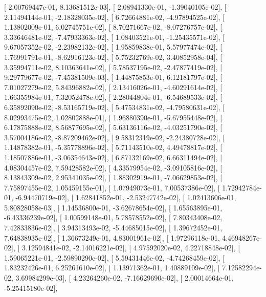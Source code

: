 \documentclass{article}
\begin{document}
       [  2.00769447e-01,   8.13681512e-03],
       [  2.08941330e-01,  -1.39040105e-02],
       [  2.11494144e-01,  -2.18328035e-02],
       [  6.72664881e-02,  -4.97894525e-02],
       [  1.13802009e-01,   6.02745751e-02],
       [  8.70271667e-02,  -8.07276757e-02],
       [  3.33646481e-02,  -7.47933363e-02],
       [  1.08403521e-01,  -1.25435571e-02],
       [  9.67057352e-02,  -2.23982132e-02],
       [  1.95859838e-01,   5.57977474e-02],
       [  1.76991791e-01,  -8.62916123e-02],
       [  5.75232769e-02,   3.40852958e-04],
       [  3.35994711e-02,   8.10363641e-02],
       [  5.78537195e-02,  -2.47877419e-02],
       [  9.29779677e-02,  -7.45381509e-03],
       [  1.44875853e-01,   6.12181797e-02],
       [  7.01027279e-02,   5.84396882e-02],
       [  2.13416026e-01,  -4.60291614e-02],
       [  1.66355984e-01,   7.32052478e-02],
       [  2.28044804e-01,  -6.54689533e-02],
       [  6.35892090e-02,  -8.53165719e-02],
       [  5.47534831e-02,  -4.79580631e-02],
       [  8.02993475e-02,   1.02802888e-01],
       [  1.96880390e-01,  -5.67955448e-02],
       [  6.17875888e-02,   8.56877695e-02],
       [  5.63136116e-02,  -4.03251790e-02],
       [  3.57004186e-02,  -8.87209462e-02],
       [  9.58312319e-02,  -2.24380728e-02],
       [  1.14878382e-01,  -5.35778896e-02],
       [  5.71143510e-02,   4.49478817e-02],
       [  1.18507886e-01,  -3.06354643e-02],
       [  6.87132169e-02,   6.66311494e-02],
       [  4.08304457e-02,   7.59428582e-02],
       [  4.33579954e-02,  -3.09105816e-02],
       [  8.13843309e-02,   2.95341035e-02],
       [  1.88302919e-01,  -7.06629853e-02],
       [  7.75897455e-02,   1.05459155e-01],
       [  1.07949073e-01,   7.00537386e-02],
       [  1.72942784e-01,  -6.94470719e-02],
       [  1.62841852e-01,  -2.53247742e-02],
       [  1.02413606e-01,   5.80828058e-03],
       [  1.14536800e-01,  -3.62678654e-02],
       [  1.65563895e-01,  -6.43336239e-02],
       [  1.00599148e-01,   5.78578552e-02],
       [  7.80343408e-02,   7.42833836e-02],
       [  3.94313493e-02,  -5.44685015e-02],
       [  1.39672452e-01,   7.64838935e-02],
       [  1.36673249e-01,   4.83001961e-02],
       [  1.97296118e-01,   4.46948267e-02],
       [  3.12594841e-02,  -2.14016221e-02],
       [  4.97592020e-02,   4.22718848e-02],
       [  1.59065221e-01,  -2.59890290e-02],
       [  5.59431446e-02,  -4.74268459e-02],
       [  1.83232426e-01,   6.25261610e-02],
       [  1.13971362e-01,   1.40889109e-02],
       [  7.12582294e-02,   3.69984299e-03],
       [  4.23264260e-02,  -7.16629690e-02],
       [  2.00014664e-01,  -5.25415180e-02],
\end{document}
